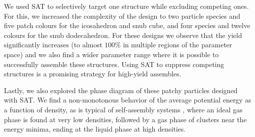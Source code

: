 \documentclass[a4paper, amsfonts, amssymb, amsmath, reprint, showkeys, nofootinbib, oneside]{revtex4-1}
\begin{document}
We used SAT to selectively target one structure while excluding competing ones. For this, we increased the complexity of the design to two particle species and five patch colours for the icosahedron and snub cube, and four species and twelve colours for the snub dodecahedron. For these designs we observe that the yield significantly increases (to almost $100\%$ in multiple regions of the parameter space) and we also find a wider parameter range where it is possible to successfully assemble these structures. Using SAT to suppress competing structures is a promising strategy for high-yield assembles.


Lastly, we also explored the phase diagram of these patchy particles designed with SAT. We find a non-monotonous behavior of the average potential energy as a function of density, as is typical of self-assembly systems \cite{Sciortino2009}, where an ideal gas phase is found at very low densities, followed by a gas phase of clusters near the energy minima, ending at the liquid phase at high densities.


\end{document}
